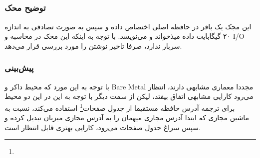 \subsection{}
\subsubsection{توضیح محک}
این مجک یک بافر در حافظه اصلی اختصاص داده و سپس به صورت تصادفی به اندازه ۲۰ گیگابایت داده میذخواند و می‌نویسد.
با توجه به اینکه این محک در محاسبه و I/O سربار ندارد، صرفا تاخیر نوشتن را مورد بررسی قرار می‌دهد. 

\subsubsection{پیش‌بینی}
با توجه به این مورد که محیط داکر و Bare Metal مجددا معماری مشابهی دارند، انتظار می‌رود کارایی
مشابهی اتفاق بیفتد، لیکن از سمت دیگر با توجه به این در این دو محیط برای ترجمه آدرس حافظه مستقیما از جدول صفحات\footnote{}
استفاده می‌کند، نسبت به ماشین مجازی که ابتدا آدرس مجازی میهمان را به آدرس مجازی میزبان تبدیل کرده و سپس سراغ حدول صفحات می‌رود،
کارایی بهتری قابل انتظار است.

